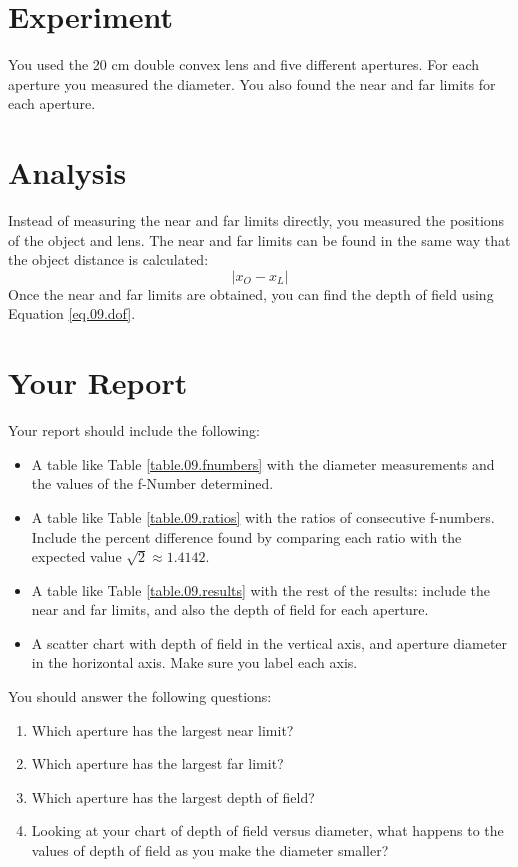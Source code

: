 \section{Experiment}
You used the 20 cm double convex lens and five different apertures. For each aperture you measured the diameter. You also found the near and far limits for each aperture.
\section{Analysis}
Instead of measuring the near and far limits directly, you measured the positions of the object and lens. The near and far limits can be found in the same way that the object distance is calculated:
\begin{equation}
    \vert x_{O} - x_{L} \vert
\end{equation}
Once the near and far limits are obtained, you can find the depth of field using Equation \ref{eq.09.dof}.
\section{Your Report}
Your report should include the following:
\begin{itemize}
    \item A table like Table \ref{table.09.fnumbers} with the diameter measurements and the values of the f-Number determined.
    \item A table like Table \ref{table.09.ratios} with the ratios of consecutive f-numbers. Include the percent difference found by comparing each ratio with the expected value $\sqrt{2} \approx 1.4142$.
    \item A table like Table \ref{table.09.results} with the rest of the results: include the near and far limits, and also the depth of field for each aperture.
    \item A scatter chart with depth of field in the vertical axis, and aperture diameter in the horizontal axis. Make sure you label each axis.
\end{itemize}
You should answer the following questions:
\begin{enumerate}
    \item Which aperture has the largest near limit?
    \item Which aperture has the largest far limit?
    \item Which aperture has the largest depth of field?
    \item Looking at your chart of depth of field versus diameter, what happens to the values of depth of field as you make the diameter smaller?
\end{enumerate}
\newpage
